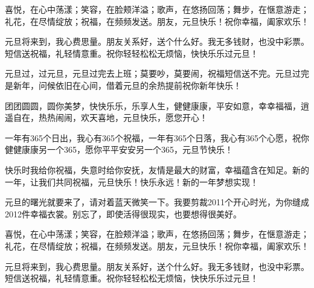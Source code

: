 \begin{theacknowledgements}
喜悦，在心中荡漾；笑容，在脸颊洋溢；歌声，在悠扬回荡；舞步，在惬意游走；礼花，在尽情绽放；祝福，在频频发送。朋友，元旦快乐！祝你幸福，阖家欢乐！

元旦将来到，我心费思量。朋友关系好，送个什么好。我无多钱财，也没中彩票。短信送祝福，礼轻情意重。祝你轻轻松松无烦恼，快快乐乐过元旦！

元旦过，过元旦，元旦过完去上班；莫要吵，莫要闹，祝福短信送不完。元旦过完是新年，问候依旧在心间，借着元旦的余热提前祝你新年快乐！

团团圆圆，圆你美梦，快快乐乐，乐享人生，健健康康，平安如意，幸幸福福，逍遥自在，热热闹闹，欢天喜地，元旦快乐，愿您开心！

一年有365个日出，我心有365个祝福，一年有365个日落，我心有365个心愿，祝你健健康康另一个365，愿你平平安安另一个365，元旦节快乐！

快乐时我给你祝福，失意时给你安抚，友情是最大的财富，幸福蕴含在知足。新的一年，让我们共同祝福，元旦快乐！快乐永远！新的一年梦想实现！

元旦的曙光就要来了，请对着蓝天微笑一下。我要剪裁2011个开心时光，为你缝成2012件幸福衣裳。别忘了，即使活得很现实，也要想得很美好。

喜悦，在心中荡漾；笑容，在脸颊洋溢；歌声，在悠扬回荡；舞步，在惬意游走；礼花，在尽情绽放；祝福，在频频发送。朋友，元旦快乐！祝你幸福，阖家欢乐！

元旦将来到，我心费思量。朋友关系好，送个什么好。我无多钱财，也没中彩票。短信送祝福，礼轻情意重。祝你轻轻松松无烦恼，快快乐乐过元旦！



\end{theacknowledgements}





